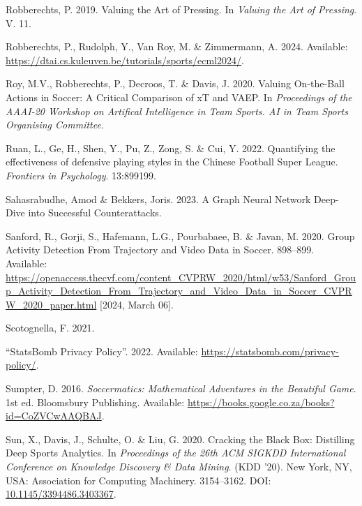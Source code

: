 \documentclass[
  a4paper,
  twoside]{uoe-thesis-template}
\newlength{\cslhangindent}
\newenvironment{CSLReferences}[2] %
 {\begin{list}{}{%
  \setlength{\itemindent}{0pt}
  \setlength{\leftmargin}{0pt}
  \setlength{\parsep}{0pt}
  \ifodd #1
   \setlength{\leftmargin}{\cslhangindent}
   \setlength{\itemindent}{-1\cslhangindent}
  \fi
  \setlength{\itemsep}{#2\baselineskip}}}
 {\end{list}}
\begin{document}
\begin{CSLReferences}{0}{0}
Robberechts, P. 2019. Valuing the {Art} of {Pressing}. In \emph{Valuing
the {Art} of {Pressing}}. V. 11.

Robberechts, P., Rudolph, Y., Van Roy, M. \& Zimmermann, A. 2024.
Available: \url{https://dtai.cs.kuleuven.be/tutorials/sports/ecml2024/}.

Roy, M.V., Robberechts, P., Decroos, T. \& Davis, J. 2020. Valuing
{On}-the-{Ball} {Actions} in {Soccer}: {A} {Critical} {Comparison} of
{xT} and {VAEP}. In \emph{Proceedings of the {AAAI}-20 {Workshop} on
{Artifical} {Intelligence} in {Team} {Sports}. {AI} in {Team} {Sports}
{Organising} {Committee}}.

Ruan, L., Ge, H., Shen, Y., Pu, Z., Zong, S. \& Cui, Y. 2022.
Quantifying the effectiveness of defensive playing styles in the
{Chinese} {Football} {Super} {League}. \emph{Frontiers in Psychology}.
13:899199.

Sahasrabudhe, Amod \& Bekkers, Joris. 2023. A {Graph} {Neural} {Network}
{Deep}-{Dive} into {Successful} {Counterattacks}.

Sanford, R., Gorji, S., Hafemann, L.G., Pourbabaee, B. \& Javan, M.
2020. Group {Activity} {Detection} {From} {Trajectory} and {Video}
{Data} in {Soccer}. 898--899. Available:
\url{https://openaccess.thecvf.com/content_CVPRW_2020/html/w53/Sanford_Group_Activity_Detection_From_Trajectory_and_Video_Data_in_Soccer_CVPRW_2020_paper.html}
{[}2024, March 06{]}.

Scotognella, F. 2021.

{``{StatsBomb} {Privacy} {Policy}''}. 2022. Available:
\url{https://statsbomb.com/privacy-policy/}.

Sumpter, D. 2016. \emph{Soccermatics: {Mathematical} {Adventures} in the
{Beautiful} {Game}}. 1st ed. Bloomsbury Publishing. Available:
\url{https://books.google.co.za/books?id=CoZVCwAAQBAJ}.

Sun, X., Davis, J., Schulte, O. \& Liu, G. 2020. Cracking the {Black}
{Box}: {Distilling} {Deep} {Sports} {Analytics}. In \emph{Proceedings of
the 26th {ACM} {SIGKDD} {International} {Conference} on {Knowledge}
{Discovery} \& {Data} {Mining}}. ({KDD} '20). New York, NY, USA:
Association for Computing Machinery. 3154--3162. DOI:
\href{https://doi.org/10.1145/3394486.3403367}{10.1145/3394486.3403367}.


\end{CSLReferences}
\end{document}

